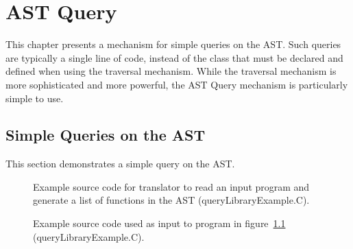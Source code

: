 \chapter{AST Query}

   This chapter presents a mechanism for simple queries on the AST.
Such queries are typically a single line of code, instead of the 
class that must be declared and defined when using the traversal mechanism.
While the traversal mechanism is more sophisticated and more powerful, the AST Query
mechanism is particularly simple to use.

\section{Simple Queries on the AST}

   This section demonstrates a simple query on the AST.

\begin{figure}[!h]
{\indent
{\mySmallFontSize


\begin{latexonly}
   
\end{latexonly}

\begin{htmlonly}
   
\end{htmlonly}

}
}
\caption{Example source code for translator to read an input program and 
         generate a list of functions in the AST (queryLibraryExample.C).}
\label{Tutorial:exampleQueryLibrary}
\end{figure}

\begin{figure}[!h]
{\indent
{\mySmallFontSize


\begin{latexonly}
   
\end{latexonly}

\begin{htmlonly}
   
\end{htmlonly}

}
}
\caption{Example source code used as input to program in
    figure~\ref{Tutorial:exampleQueryLibrary} (queryLibraryExample.C).}
\label{Tutorial:exampleInputCode_QueryLibrary}
\end{figure}

